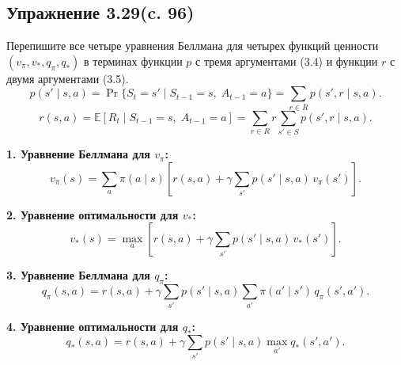 \subsection{Упражнение 3.29(c. 96)}
Перепишите все четыре уравнения Беллмана для четырех функций ценности $(v_{\pi}, v_*, q_{\pi}, q_*)$ в  терминах функции $p$ с  тремя аргументами (3.4) и функции $r$ с двумя аргументами (3.5).
\begin{equation}
p(s' \mid s,a)
=
\Pr\{ S_t = s' \mid S_{t-1} = s,\; A_{t-1} = a \}
=
\sum_{r \in R} p(s',r \mid s,a).
\tag{3.4}
\end{equation}
\begin{equation}
r(s,a)
=
\mathbb{E}\!\left[ R_t \mid S_{t-1}=s,\; A_{t-1}=a \right]
=
\sum_{r \in R} r 
\sum_{s' \in S} 
p(s',r \mid s,a).
\tag{3.5}
\end{equation}
\begin{solution}
    \textbf{1. Уравнение Беллмана для $v_{\pi}$:}
    \[
    v_{\pi}(s)
    =
    \sum_{a} \pi(a \mid s)
    \left[
    r(s,a)
    +
    \gamma
    \sum_{s'} p(s' \mid s,a)\, v_{\pi}(s')
    \right].
    \]
    
    \textbf{2. Уравнение оптимальности для $v_*$:}
    \[
    v_{*}(s)
    =
    \max_{a}
    \left[
    r(s,a)
    +
    \gamma
    \sum_{s'} p(s' \mid s,a)\, v_{*}(s')
    \right].
    \]
    
    \textbf{3. Уравнение Беллмана для $q_{\pi}$:}
    \[
    q_{\pi}(s,a)
    =
    r(s,a)
    +
    \gamma
    \sum_{s'} p(s' \mid s,a)
    \sum_{a'} \pi(a' \mid s')\, q_{\pi}(s',a').
    \]
    
    \textbf{4. Уравнение оптимальности для $q_*$:}
    \[
    q_{*}(s,a)
    =
    r(s,a)
    +
    \gamma
    \sum_{s'} p(s' \mid s,a)
    \max_{a'} q_{*}(s',a').
    \]
\end{solution}
